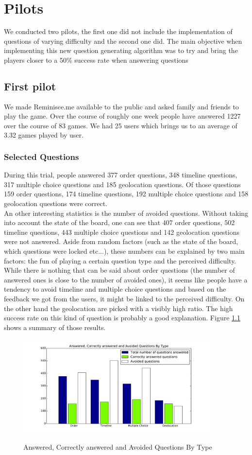 \chapter{Pilots}
We conducted two pilots, the first one did not include the implementation of questions of varying difficulty and the second one did. The main objective when implementing this new question generating algorithm was to try and bring the players closer to a 50\% success rate when answering questions
\section{First pilot}\label{sec:pilot1}
We made Reminisce.me available to the public and asked family and friends to play the game. Over the course of roughly one week people have answered 1227 over the course of 83 games. We had 25 users which brings us to an average of 3.32 games played by user.
\subsection{Selected Questions}
During this trial, people answered 377 order questions, 348 timeline questions, 317 multiple choice questions and 185 geolocation questions. Of those questions 159 order questions, 174 timeline questions, 192 multiple choice questions and 158 geolocation questions were correct.\\
An other interesting statistics is the number of avoided questions. Without taking into account the state of the board, one can see that 407 order questions, 502 timeline questions, 443 multiple choice questions and 142 geolocation questions were not answered. Aside from random factors (such as the state of the board, which questions were locked etc...), these numbers can be explained by two main factors: the fun of playing a certain question type and the perceived difficulty. While there is nothing that can be said about order questions (the number of answered ones is close to the number of avoided ones), it seems like people have a tendency to avoid timeline and multiple choice questions and based on the feedback we got from the users, it might be linked to the perceived difficulty. On the other hand the geolocation are picked with a visibly high ratio. The high success rate on this kind of question is probably a good explanation. Figure \ref{fig:p1TotCorrectAvoid} shows a summary of those results.
\begin{figure}
\centering
{\includegraphics[width=4in]{images/pilot_1_selected_questions.pdf}}
\caption{Answered, Correctly answered and Avoided Questions By Type}
\label{fig:p1TotCorrectAvoid}
\end{figure}
